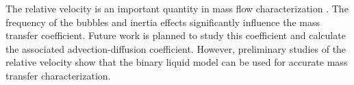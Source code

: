 \documentclass{article}
\begin{document}
The relative velocity is an important quantity in mass flow characterization
\cite{kreutzer-taylor,yue-mass}. The frequency of the bubbles \cite{kreutzer-taylor} and 
inertia effects \citet{heil-bretherton} significantly influence the mass transfer coefficient. 
Future work is planned to study this coefficient and calculate the associated advection-diffusion coefficient.
 However, preliminary
studies of the relative velocity show that the binary liquid model can be used for accurate mass
transfer characterization.

\end{document}
